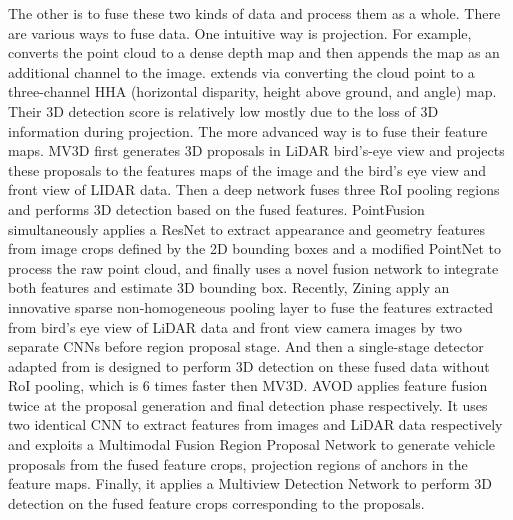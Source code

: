 \documentclass[a4paper,12pt]{article}
\begin{document}
The other is to fuse these two kinds of data and process them as a whole. There are various ways to fuse data. One intuitive way is projection. For example, \cite{DBLP:journals/corr/EitelSSRB15} converts the point cloud to a dense depth map and then appends the map as an additional channel to the image. \cite{7487370} extends \cite{DBLP:journals/corr/EitelSSRB15} via converting the cloud point to a three-channel HHA (horizontal disparity, height above ground, and angle) map. Their 3D detection score is relatively low mostly due to the loss of 3D information during projection. The more advanced way is to fuse their feature maps. MV3D \cite{DBLP:journals/corr/ChenMWLX16} first generates 3D proposals in LiDAR bird's-eye view and projects these proposals to the features maps of the image and the bird’s eye view and front view of LIDAR data. Then a deep network fuses three RoI pooling regions and performs 3D detection based on the fused features. PointFusion \cite{DBLP:journals/corr/abs-1711-10871} simultaneously applies a ResNet \cite{DBLP:journals/corr/HeZRS15} to extract appearance and geometry features from image crops defined by the 2D bounding boxes and a modified PointNet \cite{DBLP:journals/corr/QiSMG16} to process the raw point cloud, and finally uses a novel fusion network to integrate both features and estimate 3D bounding box. Recently, Zining \etal \cite{DBLP:journals/corr/abs-1711-06703} apply an innovative sparse non-homogeneous pooling layer to fuse the features extracted from bird’s eye view of LiDAR data and front view camera images by two separate CNNs before region proposal stage. And then a single-stage detector adapted from \cite{DBLP:journals/corr/abs-1708-02002} is designed to perform 3D detection on these fused data without RoI pooling, which is 6 times faster then MV3D. AVOD \cite{DBLP:journals/corr/abs-1712-02294} applies feature fusion twice at the proposal generation and final detection phase respectively.  It uses two identical CNN to extract features from images and LiDAR data respectively and exploits a Multimodal Fusion Region Proposal Network to generate vehicle proposals from the fused feature crops, projection regions of anchors in the feature maps. Finally, it applies a Multiview Detection Network to perform 3D detection on the fused feature crops corresponding to the proposals. %





\clearpage
\end{document}
